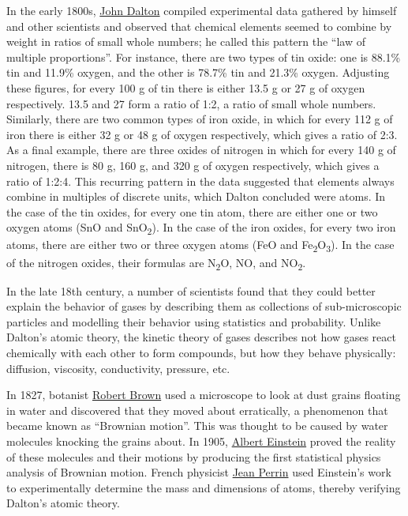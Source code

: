 In the early 1800s,
\href{https://en.wikipedia.org/wiki/John_Dalton}{John Dalton} compiled
experimental data gathered by himself and other scientists and observed
that chemical elements seemed to combine by weight in ratios of small
whole numbers; he called this pattern the ``law of multiple
proportions''. For instance, there are two types of tin oxide: one is
88.1\% tin and 11.9\% oxygen, and the other is 78.7\% tin and 21.3\%
oxygen. Adjusting these figures, for every 100 g of tin there is either
13.5 g or 27 g of oxygen respectively. 13.5 and 27 form a ratio of 1:2,
a ratio of small whole numbers. Similarly, there are two common types of
iron oxide, in which for every 112 g of iron there is either 32 g or 48
g of oxygen respectively, which gives a ratio of 2:3. As a final
example, there are three oxides of nitrogen in which for every 140 g of
nitrogen, there is 80 g, 160 g, and 320 g of oxygen respectively, which
gives a ratio of 1:2:4. This recurring pattern in the data suggested
that elements always combine in multiples of discrete units, which
Dalton concluded were atoms. In the case of the tin oxides, for every
one tin atom, there are either one or two oxygen atoms (SnO and
SnO\textsubscript{2}). In the case of the iron oxides, for every two
iron atoms, there are either two or three oxygen atoms (FeO and
Fe\textsubscript{2}O\textsubscript{3}). In the case of the nitrogen
oxides, their formulas are N\textsubscript{2}O, NO, and
NO\textsubscript{2}.

In the late 18th century, a number of scientists found that they could
better explain the behavior of gases by describing them as collections
of sub-microscopic particles and modelling their behavior using
statistics and probability. Unlike Dalton's atomic theory, the kinetic
theory of gases describes not how gases react chemically with each other
to form compounds, but how they behave physically: diffusion, viscosity,
conductivity, pressure, etc.

In 1827, botanist
\href{https://en.wikipedia.org/wiki/Robert_Brown_(botanist,_born_1773)}{Robert
Brown} used a microscope to look at dust grains floating in water and
discovered that they moved about erratically, a phenomenon that became
known as ``Brownian motion''. This was thought to be caused by water
molecules knocking the grains about. In 1905,
\href{https://en.wikipedia.org/wiki/Albert_Einstein}{Albert Einstein}
proved the reality of these molecules and their motions by producing the
first statistical physics analysis of Brownian motion. French physicist
\href{https://en.wikipedia.org/wiki/Jean_Baptiste_Perrin}{Jean Perrin}
used Einstein's work to experimentally determine the mass and dimensions
of atoms, thereby verifying Dalton's atomic theory.

